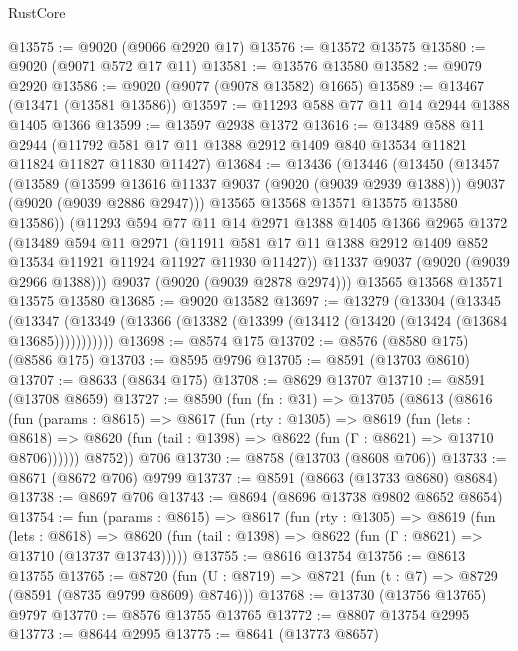 \begin{lexlean}{RustCore}
\begin{coremodule}
@13575 := @9020 (@9066 @2920 @17)
@13576 := @13572 @13575
@13580 := @9020 (@9071 @572 @17 @11)
@13581 := @13576 @13580
@13582 := @9079 @2920
@13586 := @9020 (@9077 (@9078 @13582) @1665)
@13589 := @13467 (@13471 (@13581 @13586))
@13597 := @11293 @588 @77 @11 @14 @2944 @1388 @1405 @1366
@13599 := @13597 @2938 @1372
@13616 := @13489
    @588
    @11
    @2944
    (@11792 @581 @17 @11 @1388 @2912 @1409 @840 @13534 @11821 @11824 @11827 @11830 @11427)
@13684 := @13436
    (@13446
      (@13450
        (@13457
          (@13589
            (@13599 @13616 @11337 @9037 (@9020 (@9039 @2939 @1388)))
            @9037
            (@9020 (@9039 @2886 @2947)))
          @13565
          @13568
          @13571
          @13575
          @13580
          @13586))
      (@11293
        @594
        @77
        @11
        @14
        @2971
        @1388
        @1405
        @1366
        @2965
        @1372
        (@13489
          @594
          @11
          @2971
          (@11911 @581 @17 @11 @1388 @2912 @1409 @852 @13534 @11921 @11924 @11927 @11930 @11427))
        @11337
        @9037
        (@9020 (@9039 @2966 @1388)))
      @9037
      (@9020 (@9039 @2878 @2974)))
    @13565
    @13568
    @13571
    @13575
    @13580
@13685 := @9020 @13582
@13697 := @13279
    (@13304
      (@13345
        (@13347 (@13349 (@13366 (@13382 (@13399 (@13412 (@13420 (@13424 (@13684 @13685)))))))))))
@13698 := @8574 @175
@13702 := @8576 (@8580 @175) (@8586 @175)
@13703 := @8595 @9796
@13705 := @8591 (@13703 @8610)
@13707 := @8633 (@8634 @175)
@13708 := @8629 @13707
@13710 := @8591 (@13708 @8659)
@13727 := @8590
    (fun (fn : @31) =>
    @13705
      (@8613
        (@8616
          (fun (params : @8615) =>
          @8617
            (fun (rty : @1305) =>
            @8619
              (fun (lets : @8618) =>
              @8620 (fun (tail : @1398) => @8622 (fun (Γ : @8621) => @13710 @8706))))))
        @8752))
    @706
@13730 := @8758 (@13703 (@8608 @706))
@13733 := @8671 (@8672 @706) @9799
@13737 := @8591 (@8663 (@13733 @8680) @8684)
@13738 := @8697 @706
@13743 := @8694 (@8696 @13738 @9802 @8652 @8654)
@13754 := fun (params : @8615) =>
  @8617
    (fun (rty : @1305) =>
    @8619
      (fun (lets : @8618) =>
      @8620 (fun (tail : @1398) => @8622 (fun (Γ : @8621) => @13710 (@13737 @13743)))))
@13755 := @8616 @13754
@13756 := @8613 @13755
@13765 := @8720 (fun (U : @8719) => @8721 (fun (t : @7) => @8729 (@8591 (@8735 @9799 @8609) @8746)))
@13768 := @13730 (@13756 @13765) @9797
@13770 := @8576 @13755 @13765
@13772 := @8807 @13754 @2995
@13773 := @8644 @2995
@13775 := @8641 (@13773 @8657)

\end{coremodule}
\end{lexlean}
